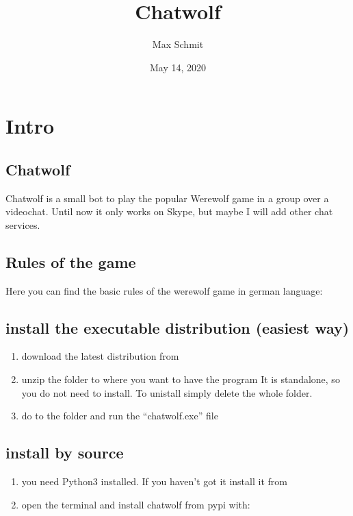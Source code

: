 \documentclass[letterpaper,10pt,english]{sphinxmanual}
\title{Chatwolf}
\date{May 14, 2020}
\author{Max Schmit}
\begin{document}
\pagestyle{empty}
\sphinxmaketitle
\pagestyle{plain}
\sphinxtableofcontents
\pagestyle{normal}
\label{\detokenize{index::doc}}



\chapter{Intro}
\label{\detokenize{intro:intro}}\label{\detokenize{intro::doc}}

\section{Chatwolf}
\label{\detokenize{data/Readme:chatwolf}}\label{\detokenize{data/Readme::doc}}
Chatwolf is a small bot to play the popular Werewolf game in a group over a videochat.
Until now it only works on Skype, but maybe I will add other chat services.


\section{Rules of the game}
\label{\detokenize{data/Readme:rules-of-the-game}}
Here you can find the basic rules of the werewolf game in german language:


\section{install the executable distribution (easiest way)}
\label{\detokenize{data/Readme:install-the-executable-distribution-easiest-way}}\begin{enumerate}
%
\item {} 
download the latest distribution from 

\item {} 
unzip the folder to where you want to have the program
It is standalone, so you do not need to install. To unistall simply delete the whole folder.

\item {} 
do to the folder and run the “chatwolf.exe” file

\end{enumerate}


\section{install by source}
\label{\detokenize{data/Readme:install-by-source}}\begin{enumerate}
%
\item {} 
you need Python3 installed.
If you haven’t got it install it from 

\item {} 
open the terminal and install chatwolf from pypi with:

\end{enumerate}
\end{document}
